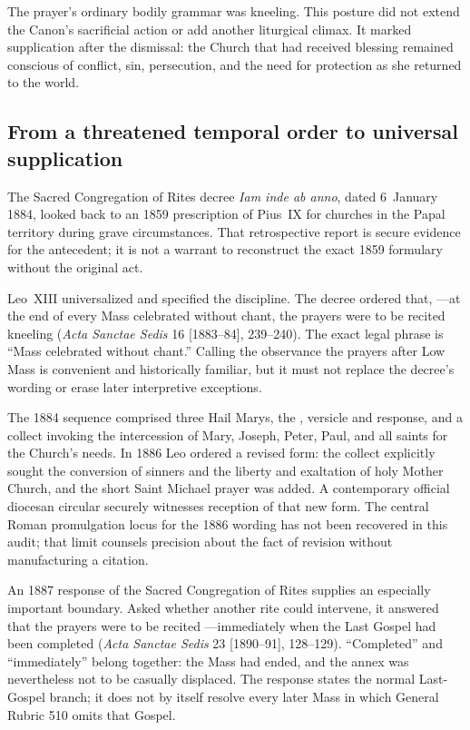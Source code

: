 The prayer's ordinary bodily grammar was kneeling. This posture did not extend the Canon's sacrificial action or add another liturgical climax. It marked supplication after the dismissal: the Church that had received blessing remained conscious of conflict, sin, persecution, and the need for protection as she returned to the world.

\subsection*{From a threatened temporal order to universal supplication}

The Sacred Congregation of Rites decree \emph{Iam inde ab anno}, dated 6~January 1884, looked back to an 1859 prescription of Pius~IX for churches in the Papal territory during grave circumstances. That retrospective report is secure evidence for the antecedent; it is not a warrant to reconstruct the exact 1859 formulary without the original act.

Leo~XIII universalized and specified the discipline. The decree ordered that, ---at the end of every Mass celebrated without chant, the prayers were to be recited kneeling (\emph{Acta Sanctae Sedis} 16 [1883--84], 239--240). The exact legal phrase is “Mass celebrated without chant.” Calling the observance the prayers after Low Mass is convenient and historically familiar, but it must not replace the decree's wording or erase later interpretive exceptions.

The 1884 sequence comprised three Hail Marys, the , versicle and response, and a collect invoking the intercession of Mary, Joseph, Peter, Paul, and all saints for the Church's needs. In 1886 Leo ordered a revised form: the collect explicitly sought the conversion of sinners and the liberty and exaltation of holy Mother Church, and the short Saint Michael prayer was added. A contemporary official diocesan circular securely witnesses reception of that new form. The central Roman promulgation locus for the 1886 wording has not been recovered in this audit; that limit counsels precision about the fact of revision without manufacturing a citation.

An 1887 response of the Sacred Congregation of Rites supplies an especially important boundary. Asked whether another rite could intervene, it answered that the prayers were to be recited ---immediately when the Last Gospel had been completed (\emph{Acta Sanctae Sedis} 23 [1890--91], 128--129). “Completed” and “immediately” belong together: the Mass had ended, and the annex was nevertheless not to be casually displaced. The response states the normal Last-Gospel branch; it does not by itself resolve every later Mass in which General Rubric 510 omits that Gospel.

